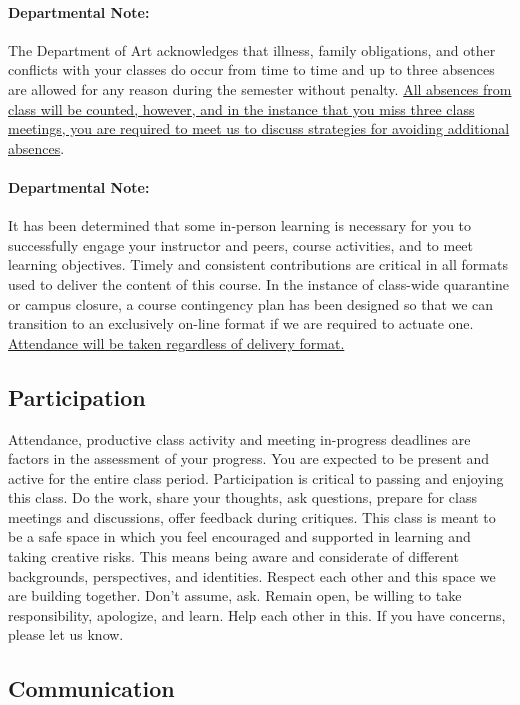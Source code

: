\paragraph{Departmental Note:} The Department of Art acknowledges that illness, family obligations, and other conflicts with your classes do occur from time to time and up to three absences are allowed for any reason during the semester without penalty. \ul{All absences from class will be counted, however, and in the instance that you miss three class meetings, you are required to meet us to discuss strategies for avoiding additional absences}.

\paragraph{Departmental Note:} It has been determined that some in-person learning is necessary for you to successfully engage your instructor and peers, course activities, and to meet learning objectives. Timely and consistent contributions are critical in all formats used to deliver the content of this course. In the instance of class-wide quarantine or campus closure, a course contingency plan has been designed so that we can transition to an exclusively on-line format if we are required to actuate one. \ul{Attendance will be taken regardless of delivery format.}


\subsection{Participation}

Attendance, productive class activity and meeting in-progress deadlines are factors in the assessment of your progress. You are expected to be present and active for the entire class period. Participation is critical to passing and enjoying this class. Do the work, share your thoughts, ask questions, prepare for class meetings and discussions, offer feedback during critiques. This class is meant to be a safe space in which you feel encouraged and supported in learning and taking creative risks. This means being aware and considerate of different backgrounds, perspectives, and identities. Respect each other and this space we are building together. Don’t assume, ask. Remain open, be willing to take responsibility, apologize, and learn. Help each other in this. If you have concerns, please let us know.

\hypertarget{communication}{%
      \subsection{Communication}}

